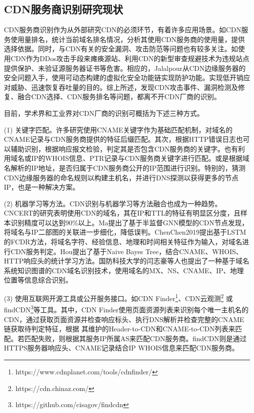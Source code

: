 
\subsection{CDN服务商识别研究现状}


CDN服务商识别作为从外部研究CDN的必须环节，有着许多应用场景。如CDN服务使用量排名，统计当前域名排名情况，分析其使用CDN服务商的使用量，提供选择依据。同时，与CDN有关的安全漏洞、攻击防范等问题也有较多关注。如使用CDN作为DDos攻击手段\cite{Guo2020}来瘫痪源站、利用CDN的新型审查规避技术\cite{Wei2021}为违规站点提供保护、未验证源服务器证书\cite{SHOBIRI2021}等危害。相应的，Jalalpour\cite{Jalalpour2018}从CDN边缘服务器的安全问题入手，使用可动态构建的虚拟化安全功能链实现防护功能。实现低开销应对威胁、迅速恢复吞吐量的目的。综上所述，发现CDN攻击事件、漏洞检测及修复、融合CDN选择、CDN服务排名等问题，都离不开CDN厂商的识别。

目前，学术界和工业界对CDN厂商的识别可概括为下述三种方式。
 
(1) 关键字匹配。许多研究\cite{Huang2008,Adhikari2014,Guo2018}使用CNAME关键字作为基础匹配机制，对域名的CNAME记录与CDN服务商提供的特征后缀匹配。其次，根据HTTP错误日志\cite{Huang2008,Guo2018}也可以辅助识别，根据响应报文检验，判定其是否包含CDN服务商的关键字。也有利用域名或IP的WHOIS\cite{Adhikari2014}信息、PTR\cite{Chen2019}记录与CDN服务商关键字进行匹配。或是根据域名解析的IP地址，是否归属于CDN服务商公开的IP范围进行识别\cite{Choffnes2017}。特别的，猜测CDN边缘服务器的命名规则以构建主机名，并进行DNS探测以获得更多的节点IP\cite{Hohlfeld2018,Timm2018}，也是一种解决方案。

(2) 机器学习等方法。CDN识别与机器学习等方法融合也成为一种趋势。CNCERT\cite{Li2020}的研究表明使用CDN的域名，其在IP和TTL的特征有明显区分度，且样本识别精度可以达到90\%以上。Ma\cite{Ma2021}提出了基于半监督GNN模型的CDN节点发现，将域名与IP二部图的关联进一步细化，降低误判。Chen{Chen2019}提出基于LSTM的FCDR方法，将域名字符、经验信息、地理和时间相关特征作为输入，对域名进行CDN服务判定。Hou\cite{Hou2021}提出了基于Naive Bayes Tree\cite{Liang2006}，结合CNAME、WHOIS、HTTP响应头的统计学习方法\cite{Hou2021}。国防科技大学的闫志豪\cite{yan-2022}等人也提出了一种基于域名系统知识图谱的CDN域名识别技术，使用域名的MX、NS、CNAME、IP、地理位置等信息综合识别。 

(3) 使用互联网开源工具或公开服务接口。如CDN Finder\footnote{https://www.cdnplanet.com/tools/cdnfinder/}、CDN云观测\footnote{https://cdn.chinaz.com/}
或findCDN\footnote{https://github.com/cisagov/findcdn}等工具。其中，CDN Finder使用页面资源列表来识别每个唯一主机名的CDN，通过获取页面资源并检查响应标头、执行DNS解析并检查完整的CNAME链获取待判定特征，根据
其维护的Header-to-CDN和CNAME-to-CDN列表来匹配。若匹配失败，则根据其服务IP所属AS来匹配CDN服务商。findCDN则是通过HTTPS服务器响应头、CNAME记录结合IP WHOIS信息来匹配CDN服务商。 

